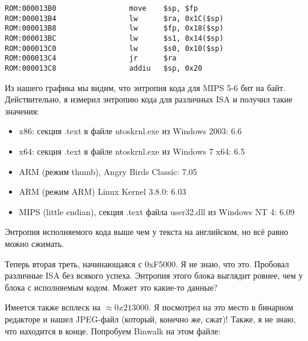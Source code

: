 \begin{lstlisting}[style=customasmMIPS]
ROM:000013B0                 move    $sp, $fp
ROM:000013B4                 lw      $ra, 0x1C($sp)
ROM:000013B8                 lw      $fp, 0x18($sp)
ROM:000013BC                 lw      $s1, 0x14($sp)
ROM:000013C0                 lw      $s0, 0x10($sp)
ROM:000013C4                 jr      $ra
ROM:000013C8                 addiu   $sp, 0x20
\end{lstlisting}

Из нашего графика мы видим, что энтропия кода для MIPS 5-6 бит на байт.
Действительно, я измерил энтропию кода для различных \ac{ISA} и получил такие значения:

\begin{itemize}
\item x86: секция .text в файле ntoskrnl.exe из Windows 2003: 6.6
\item x64: секция .text в файле ntoskrnl.exe из Windows 7 x64: 6.5
\item ARM (режим thumb), Angry Birds Classic: 7.05
\item ARM (режим ARM) Linux Kernel 3.8.0: 6.03
\item MIPS (little endian), секция .text файла user32.dll из Windows NT 4: 6.09
\end{itemize}

Энтропия исполняемого кода выше чем у текста на английском, но всё равно можно сжимать.

Теперь вторая треть, начинающаяся с 0xF5000. Я не знаю, что это. Пробовал различные \ac{ISA} без всякого успеха.
Энтропия этого блока выглядит ровнее, чем у блока с исполняемым кодом.
Может это какие-то данные?

Имеется также всплеск на $\approx 0x213000$.
Я посмотрел на это место в бинарном редакторе и нашел JPEG-файл (который, конечно же, сжат)!
Также, я не знаю, что находится в конце.
Попробуем Binwalk на этом файле:

